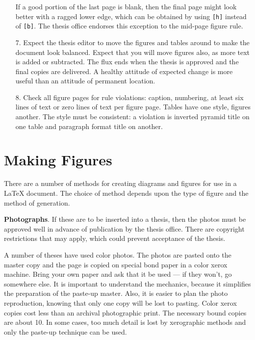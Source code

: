 \begin{itemize}
          If a good portion of the last page is blank, then the final
          page might look better with a ragged lower edge, which can be
          obtained by using \verb"[h]" instead of \verb"[b]". The thesis
          office endorses this exception to the mid-page figure rule.

\item[7.] Expect the thesis editor to move the figures and tables
          around to make the document look balanced. Expect that you
          will move figures also, as more text is added or subtracted.
          The flux ends when the thesis is approved and the final copies
          are delivered. A healthy attitude of expected change is more
          useful than an attitude of permanent location.

\item[8.] Check all figure pages for rule violations: caption,
          numbering, at least six lines of text or zero lines of text
          per figure page. Tables have one style, figures another.
          The style must be consistent: a violation is inverted pyramid
          title on one table and paragraph format title on another.

\end{itemize}


\section{Making Figures}

There are a number of methods for creating diagrams and figures for use
in a \LaTeX{} document. The choice of method depends upon the type of
figure and the method of generation.

{\bf Photographs}. If these are to be inserted into a thesis, then the
photos must be approved well in advance of publication by the thesis
office. There are copyright restrictions that may apply, which could
prevent acceptance of the thesis.

A number of theses have used color photos. The photos are pasted onto
the master copy and the page is copied on special bond paper in a color
xerox machine. Bring your own paper and ask that it be used --- if they
won't, go somewhere else. It is important to understand the mechanics,
because it simplifies the preparation of the paste-up master. Also, it
is easier to plan the photo reproduction, knowing that only one copy
will be lost to pasting. Color xerox copies cost less than an archival
photographic print. The necessary bound copies are about 10. In some
cases, too much detail is lost by xerographic methods and only the
paste-up technique can be used.

